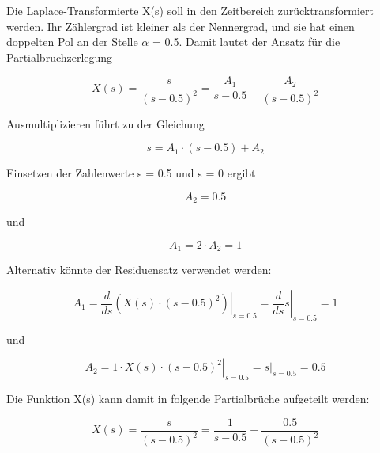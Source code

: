 \noindent Die Laplace-Transformierte X(s) soll in den Zeitbereich zurücktransformiert werden. Ihr Zählergrad ist kleiner als der Nennergrad, und sie hat einen doppelten Pol an der Stelle $\alpha$ = 0.5. Damit lautet der Ansatz für die Partialbruchzerlegung

\begin{equation}\label{eq:fourhundredsfourtysix}
X\left(s\right)=\frac{s}{\left(s-0.5\right)^{2} } =\frac{A_{1} }{s-0.5} +\frac{A_{2} }{\left(s-0.5\right)^{2} } 
\end{equation}

\noindent Ausmultiplizieren f\"{u}hrt zu der Gleichung

\begin{equation}\label{eq:fourhundredsfourtyseven}
s=A_{1} \cdot \left(s-0.5\right)+A_{2} 
\end{equation}

\noindent Einsetzen der Zahlenwerte s = 0.5 und s = 0 ergibt

\begin{equation}\label{eq:fourhundredsfourtyeight}
A_{2} =0.5
\end{equation}

\noindent und 

\begin{equation}\label{eq:fourhundredsfourtynine}
A_{1} =2\cdot A_{2} =1
\end{equation}

\noindent Alternativ könnte der Residuensatz verwendet werden:

\begin{equation}\label{eq:fourhundredsfifty}
A_{1} =\frac{d}{ds} \left. \left(X\left(s\right)\cdot \left(s-0.5\right)^{2} \right)\right|_{s=0.5} =\left. \frac{d}{ds} s\right|_{s=0.5} =1
\end{equation}

\noindent und 

\begin{equation}\label{eq:fourhundredsfiftyone}
A_{2} =1\cdot \left. X\left(s\right)\cdot \left(s-0.5\right)^{2} \right|_{s=0.5} =\left. s\right|_{s=0.5} =0.5
\end{equation}

\noindent Die Funktion X(s) kann damit in folgende Partialbrüche aufgeteilt werden:

\begin{equation}\label{eq:fourhundredsfiftytwo}
X\left(s\right)=\frac{s}{\left(s-0.5\right)^{2} } =\frac{1}{s-0.5} +\frac{0.5}{\left(s-0.5\right)^{2} } 
\end{equation}

